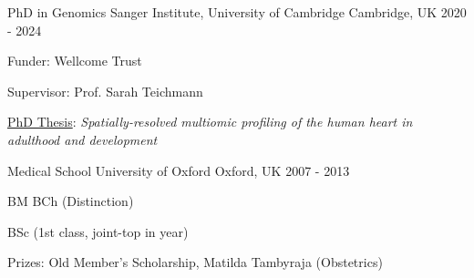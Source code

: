 

\begin{cventries}

  \cventry
    {PhD in Genomics} %
    {Sanger Institute, University of Cambridge} %
    {Cambridge, UK} %
    {2020 - 2024} %
    {
      \begin{cvitems} %
        \item {Funder: Wellcome Trust}
        \item {Supervisor: Prof. Sarah Teichmann}
        \item {\href{https://www.repository.cam.ac.uk/items/eb414b3c-a798-4945-aa01-fd1482404300}{PhD Thesis}: \textit{Spatially-resolved multiomic profiling of the human heart in
adulthood and development}}
      \end{cvitems}
    }

  \cventry
    {Medical School} %
    {University of Oxford} %
    {Oxford, UK} %
    {2007 - 2013} %
    {
      \begin{cvitems} %
        \item {BM BCh (Distinction)}
        \item {BSc (1st class, joint-top in year)}
        \item {Prizes: Old Member's Scholarship, Matilda Tambyraja (Obstetrics)}
      \end{cvitems}
    }


\end{cventries}


